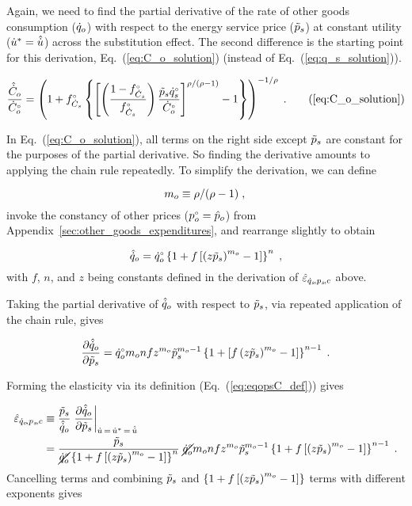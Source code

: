 \documentclass[12pt]{article}\usepackage[]{graphicx}\usepackage[]{xcolor}
\begin{document}
Again, we need to find the partial
derivative of the rate of other goods consumption ($\dot{q}_o$) 
with respect to the energy service price ($\tilde{p}_s$) 
at constant utility (${\dot{u}}^* = \hat{\dot{u}}$)
across the substitution effect.
The second difference is 
the starting point for this derivation, 
Eq.~(\ref{eq:C_o_solution}) 
(instead of Eq.~(\ref{eq:q_s_solution})).

\begin{equation}
  \frac{\rasub{C}_o}{\rbempl{C}_o} = \Cosolution{} \; . \tag{\ref{eq:C_o_solution}}
\end{equation}

In Eq.~(\ref{eq:C_o_solution}), all terms on the right side except $\tilde{p}_s$ are constant 
for the purposes of the partial derivative. 
So finding the derivative amounts to applying the chain rule repeatedly.
To simplify the derivation, 
we can define 

\begin{equation}
  m_o \equiv \rho / (\rho - 1) \; , \\
\end{equation}
%
invoke the constancy of other prices (${}{p}^{\scriptscriptstyle \circ}_o = \hat{p}_o$)
from Appendix~\ref{sec:other_goods_expenditures}, and
rearrange slightly to obtain

\begin{equation} 
  \hat{\dot{q}}_o = {}{\dot{q}}^{\scriptscriptstyle \circ}_o \left\{ 1 + f \left[ \left( z \tilde{p}_s \right)^{m_o} - 1 \right] \right\}^n \; ,
\end{equation}
%
with $f$, $n$, and $z$ being constants defined in the derivation of $\hat{\varepsilon}_{\dot{q}_s\!,p_s\!,c}$ above.

Taking the partial derivative of $\hat{\dot{q}}_o$ with respect to $\tilde{p}_s$, 
via repeated application of the chain rule, gives

\begin{equation}
  \pdv{\hat{\dot{q}}_o}{\tilde{p}_s} = {}{\dot{q}}^{\scriptscriptstyle \circ}_o m_o n f z^{m_o} \tilde{p}_s^{m_o-1} 
                \left\{ 1 + \left[ f \left( z \tilde{p}_s \right)^{m_o} - 1 \right] \right\}^{n-1} \; .
\end{equation}

Forming the elasticity via its definition (Eq.~(\ref{eq:eqopsC_def})) gives

\begin{align}
  \eqopsChat &\equiv \frac{\amacro{p}_s}{\rasub{q}_o} \eval{\pdv{\rasub{q}_o}{\amacro{p}_s}}_{\rate{u} \, = \, \rbsub{u} \, = \, \rasub{u}} \nonumber \\
         &= \frac{\amacro{p}_s}{\cancel{\rorig{q}_o} \left\{ 1 + f \left[ \left( z \amacro{p}_s \right)^{m_o} - 1 \right] \right\}^n } \;
           \cancel{\rorig{q}_o} m_o n f z^{m_o} \amacro{p}_s^{m_o - 1} 
                \left\{ 1 + f \left[ \left( z \amacro{p}_s \right)^{m_o} - 1 \right] \right\} ^{n-1}  \; .
\end{align}
%
Cancelling terms and
combining $\tilde{p}_s$ and $\left\{ 1 + f  \left[ \left( z \tilde{p}_s \right)^{m_o} - 1 \right] \right\}$ 
terms with different exponents gives
\end{document}
